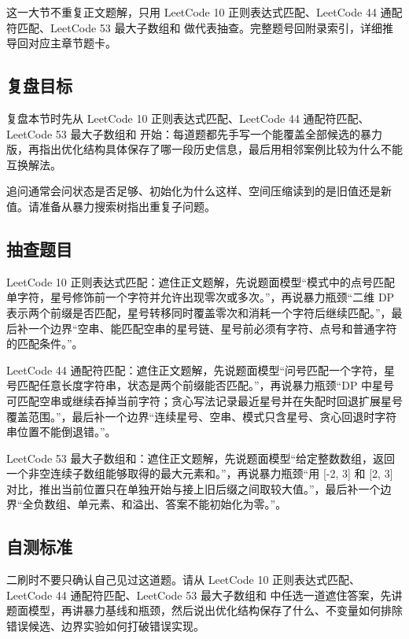 这一大节不重复正文题解，只用 LeetCode 10 正则表达式匹配、LeetCode 44 通配符匹配、LeetCode 53 最大子数组和 做代表抽查。完整题号回附录索引，详细推导回对应主章节题卡。

\subsection{复盘目标}

复盘本节时先从 LeetCode 10 正则表达式匹配、LeetCode 44 通配符匹配、LeetCode 53 最大子数组和 开始：每道题都先手写一个能覆盖全部候选的暴力版，再指出优化结构具体保存了哪一段历史信息，最后用相邻案例比较为什么不能互换解法。

追问通常会问状态是否足够、初始化为什么这样、空间压缩读到的是旧值还是新值。请准备从暴力搜索树指出重复子问题。

\subsection{抽查题目}

LeetCode 10 正则表达式匹配：遮住正文题解，先说题面模型“模式中的点号匹配单字符，星号修饰前一个字符并允许出现零次或多次。”，再说暴力瓶颈“二维 DP 表示两个前缀是否匹配，星号转移同时覆盖零次和消耗一个字符后继续匹配。”，最后补一个边界“空串、能匹配空串的星号链、星号前必须有字符、点号和普通字符的匹配条件。”。

LeetCode 44 通配符匹配：遮住正文题解，先说题面模型“问号匹配一个字符，星号匹配任意长度字符串，状态是两个前缀能否匹配。”，再说暴力瓶颈“DP 中星号可匹配空串或继续吞掉当前字符；贪心写法记录最近星号并在失配时回退扩展星号覆盖范围。”，最后补一个边界“连续星号、空串、模式只含星号、贪心回退时字符串位置不能倒退错。”。

LeetCode 53 最大子数组和：遮住正文题解，先说题面模型“给定整数数组，返回一个非空连续子数组能够取得的最大元素和。”，再说暴力瓶颈“用 [-2, 3] 和 [2, 3] 对比，推出当前位置只在单独开始与接上旧后缀之间取较大值。”，最后补一个边界“全负数组、单元素、和溢出、答案不能初始化为零。”。

\subsection{自测标准}

二刷时不要只确认自己见过这道题。请从 LeetCode 10 正则表达式匹配、LeetCode 44 通配符匹配、LeetCode 53 最大子数组和 中任选一道遮住答案，先讲题面模型，再讲暴力基线和瓶颈，然后说出优化结构保存了什么、不变量如何排除错误候选、边界实验如何打破错误实现。

